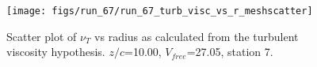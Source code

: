 \begin{figure}[H]
\centering
\texttt{[image: figs/run\_67/run\_67\_turb\_visc\_vs\_r\_meshscatter]}
\caption{Scatter plot of $\nu_T$ vs radius as calculated from the turbulent viscosity hypothesis. $z/c$=10.00, $V_{free}$=27.05, station 7.}
\label{fig:run_67_turb_visc_vs_r_meshscatter}
\end{figure}



